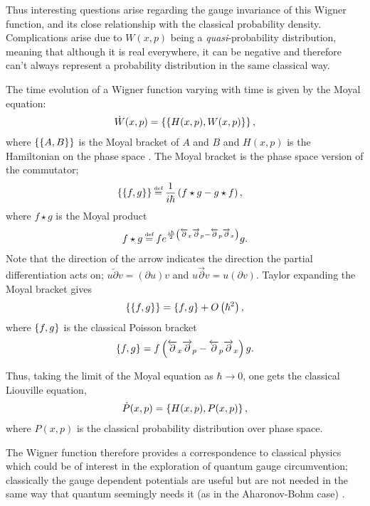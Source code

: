 Thus interesting questions arise regarding the gauge invariance of this Wigner
function, and its close relationship with the classical probability density.
Complications arise due to $W(x,p)$ being a \textit{quasi}-probability
distribution, meaning that although it is real everywhere, it can be negative
and therefore can't always represent a probability distribution in the same
classical way.

The time evolution of a Wigner function varying with time is given by the Moyal
equation:
\begin{align}
    \dot W(x,p) = \left\{ \left\{ H(x,p), W(x,p) \right\} \right\},
\end{align}
where $\left\{ \left\{ A, B \right\} \right\}$ is the Moyal bracket of $A$ and $B$ and $H(x,p)$ is the
Hamiltonian on the phase space \cite{moyal}. The Moyal bracket is the phase space version of
the commutator;
\begin{align}
    \moyal{f}{g} &\defeq \frac{1}{i \hbar}\left( f \star g - g \star f \right),
\end{align}
where $f \star g$ is the Moyal product
\begin{align}
    f \star g \defeq fe^{\frac{i \hbar}{2} \left( \overleftarrow \partial_x
        \overrightarrow \partial_p - \overleftarrow \partial_p
        \overrightarrow \partial_x \right)} g.
\end{align}
Note that the direction of the arrow indicates the direction the partial
differentiation acts on; $u \overleftarrow \partial v = \left( \partial u\right)
v$ and $u \overrightarrow \partial v = u \left( \partial v \right)$. Taylor
expanding the Moyal bracket gives
\begin{align}
    \left\{ \left\{ f, g \right\} \right\} = \left\{ f, g \right\} + O \left( \hbar^2 \right),
\end{align}
where $\left\{ f, g \right\}$ is the classical Poisson bracket
\begin{align}
    \left\{ f, g \right\} = f \left( \overleftarrow \partial_x \overrightarrow \partial_p
    - \overleftarrow \partial_p \overrightarrow \partial_x \right)  g.
\end{align}

Thus, taking the limit of the Moyal equation as $\hbar \rightarrow 0$, one gets
the classical Liouville equation,
\begin{align}
    \dot P(x,p) = \left\{ H(x,p), P(x,p) \right\},
\end{align}
where $P(x,p)$ is the classical probability distribution over phase space.

The Wigner function therefore provides a correspondence to classical physics
which could be of interest in the exploration of quantum gauge circumvention;
classically the gauge dependent potentials are useful but are not needed in the
same way that quantum seemingly needs it (as in the Aharonov-Bohm case)
\cite{aharonov-bohm}.
